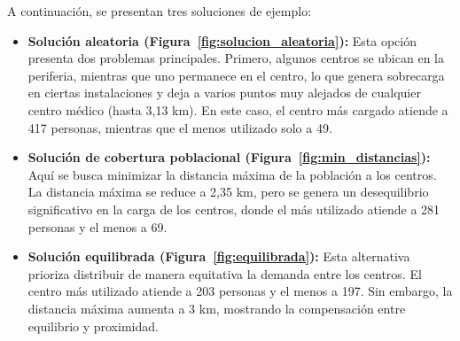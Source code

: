 \documentclass[12pt,a4paper]{book}
\begin{document}
A continuación, se presentan tres soluciones de ejemplo:

\begin{itemize}
    \item \textbf{Solución aleatoria (Figura~\ref{fig:solucion_aleatoria}):} Esta opción presenta dos problemas principales. Primero, algunos centros se ubican en la periferia, mientras que uno permanece en el centro, lo que genera sobrecarga en ciertas instalaciones y deja a varios puntos muy alejados de cualquier centro médico (hasta 3,13 km). En este caso, el centro más cargado atiende a 417 personas, mientras que el menos utilizado solo a 49.
    \item \textbf{Solución de cobertura poblacional (Figura~\ref{fig:min_distancias}):} Aquí se busca minimizar la distancia máxima de la población a los centros. La distancia máxima se reduce a 2,35 km, pero se genera un desequilibrio significativo en la carga de los centros, donde el más utilizado atiende a 281 personas y el menos a 69.
    \item \textbf{Solución equilibrada (Figura~\ref{fig:equilibrada}):} Esta alternativa prioriza distribuir de manera equitativa la demanda entre los centros. El centro más utilizado atiende a 203 personas y el menos a 197. Sin embargo, la distancia máxima aumenta a 3 km, mostrando la compensación entre equilibrio y proximidad.
\end{itemize}
\end{document}
